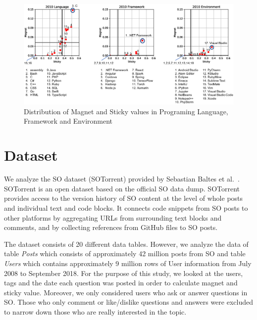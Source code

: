 \documentclass[conference]{IEEEtran}
\begin{document}
\begin{figure}[t]
 \centering
 \includegraphics[width=1.0\hsize]{img/2010allnew.eps}  
 \caption{Distribution of Magnet and Sticky values in Programing Language, Framework and Environment} 
 \label{fig:2010} 
\end{figure}


\section{Dataset}
We analyze the SO dataset (SOTorrent) provided by Sebastian Baltes et al.~\cite{msr2019challenge}. SOTorrent is an open dataset based on the official SO data dump. SOTorrent provides access to the version history of SO content at the level of whole posts and individual text and code blocks. It connects code snippets from SO posts to other platforms by aggregating URLs from surrounding text blocks and comments, and by collecting references from GitHub files to SO posts.

The dataset consists of 20 different data tables.
However, we analyze the data of table \emph{Posts} which consists of approximately 42 million posts from SO and table \emph{Users} which contains approximately 9 million rows of User information from July 2008 to September 2018. For the purpose of this study, we looked at the users, tags and the date each question was posted in order to calculate magnet and sticky value. Moreover, we only considered users who ask or answer questions in SO. Those who only comment or like/dislike questions and answers were excluded to narrow down those who are really interested in the topic.
\end{document}
